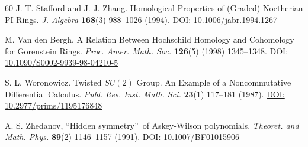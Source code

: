 \documentclass{amsart}
\theoremstyle{definition}
\theoremstyle{remark}
\numberwithin{equation}{section}
\begin{document}
\begin{thebibliography}{60}
 J. T. Stafford and J. J. Zhang. Homological Properties of (Graded) Noetherian PI Rings. {\em J. Algebra} {\bf 168}(3)  988--1026 (1994). \href{https://www.sciencedirect.com/science/article/pii/S0021869384712671}{DOI: 10.1006/jabr.1994.1267}

 M. Van den Bergh. A Relation Between Hochschild Homology and Cohomology for Gorenstein Rings. {\em Proc. Amer. Math. Soc.} {\bf 126}(5) (1998) 1345--1348. \href{https://www.ams.org/journals/proc/1998-126-05/S0002-9939-98-04210-5/}{DOI: 10.1090/S0002-9939-98-04210-5}

 S. L. Woronowicz. Twisted $SU(2)$ {G}roup. An {E}xample of a {N}oncommutative {D}ifferential {C}alculus. {\em Publ. Res. Inst. Math. Sci.} {\bf 23}(1) 117--181 (1987). \href{https://ems.press/journals/prims/articles/3332}{DOI: 10.2977/prims/1195176848}

 A. S. Zhedanov, \textquotedblleft Hidden symmetry\textquotedblright\ of Askey-Wilson polynomials. {\em Theoret. and Math. Phys.} {\bf 89}(2) 1146--1157 (1991). \href{https://doi.org/10.1007/BF01015906}{DOI: 10.1007/BF01015906}

\end{thebibliography}
\end{document}
